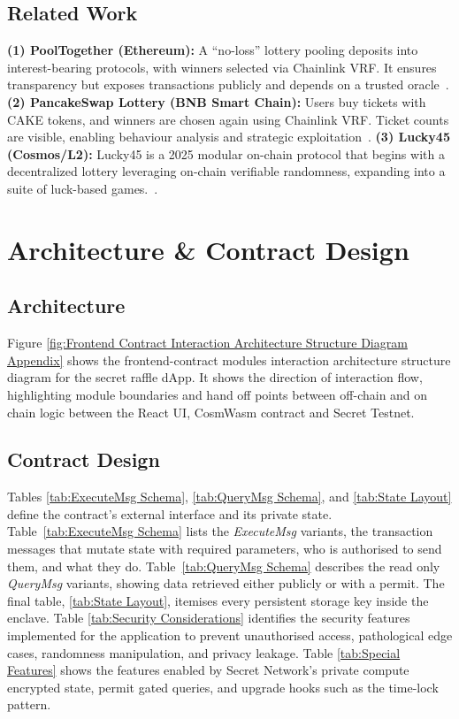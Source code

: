 \documentclass[9pt]{extarticle}
\begin{document}
\subsection{Related Work}
\textbf{(1) PoolTogether (Ethereum):} A ``no-loss'' lottery pooling deposits into interest-bearing protocols, with winners selected via Chainlink VRF. It ensures transparency but exposes transactions publicly and depends on a trusted oracle~\cite{PoolTogether}. \textbf{(2) PancakeSwap Lottery (BNB Smart Chain):} Users buy tickets with CAKE tokens, and winners are chosen again using Chainlink VRF. Ticket counts are visible, enabling behaviour analysis and strategic exploitation~\cite{PancakeSwap}. \textbf{(3) Lucky45 (Cosmos/L2):} Lucky45 is a 2025 modular on-chain protocol that begins with a decentralized lottery leveraging on-chain verifiable randomness, expanding into a suite of luck-based games.~\cite{Lucky45}.

\section{Architecture \& Contract Design}

\subsection{Architecture}
Figure \ref{fig:Frontend Contract Interaction Architecture Structure Diagram Appendix} shows the frontend-contract modules interaction architecture structure diagram for the secret raffle dApp. It shows the direction of interaction flow, highlighting module boundaries and hand off points between off-chain and on chain logic between the React UI, CosmWasm contract and Secret Testnet.

\subsection{Contract Design}

Tables \ref{tab:ExecuteMsg Schema}, \ref{tab:QueryMsg Schema}, and \ref{tab:State Layout} define the contract's external interface and its private state. Table~\ref{tab:ExecuteMsg Schema} lists the \emph{ExecuteMsg} variants, the transaction messages that mutate state with required parameters, who is authorised to send them, and what they do. Table~\ref{tab:QueryMsg Schema} describes the read only \emph{QueryMsg} variants, showing data retrieved either publicly or with a permit. The final table, \ref{tab:State Layout}, itemises every persistent storage key inside the enclave. Table \ref{tab:Security Considerations} identifies the security features implemented for the application to prevent unauthorised access, pathological edge cases, randomness manipulation, and privacy leakage. Table \ref{tab:Special Features} shows the features enabled by Secret Network's private compute encrypted state, permit gated queries, and upgrade hooks such as the time-lock pattern.
\end{document}
